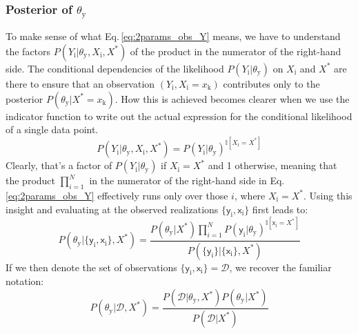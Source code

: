 \documentclass[]{report}
\begin{document}
\subsubsection{Posterior of $\theta_\mathrm{y}$}
To make sense of what Eq.\,\ref{eq:2params_obs_Y} means, we have to understand the factors $P(Y_\mathrm{i}|\theta_\mathrm{y}, X_\mathrm{i}, X^*)$ of the product in the numerator of the right-hand side. The conditional dependencies of the likelihood $P(Y_\mathrm{i}|\theta_\mathrm{y})$ on $X_\mathrm{i}$ and $X^*$ are there to ensure that an observation $(Y_\mathrm{i}, X_\mathrm{i}=x_\mathrm{k})$ contributes only to the posterior $P(\theta_\mathrm{y}|X^*=x_\mathrm{k})$. How this is achieved becomes clearer when we use the indicator function to write out the actual expression for the conditional likelihood of a single data point.
\begin{equation}
P(Y_\mathrm{i}|\theta_\mathrm{y}, X_\mathrm{i}, X^*) = P(Y_\mathrm{i}|\theta_\mathrm{y})^{\mathbb{I}[X_\mathrm{i}=X^*]} 
\end{equation}
Clearly, that's a factor of $P(Y_\mathrm{i}|\theta_\mathrm{y})$ if $X_\mathrm{i}=X^*$ and 1 otherwise, meaning that the product $\prod_{i=1}^{N}$ in the numerator of the right-hand side in Eq.\,\ref{eq:2params_obs_Y} effectively runs only over those $i$, where $X_\mathrm{i}=X^*$. Using this insight and evaluating at the observed realizations $\{\mathsf{y}_\mathrm{i}, \mathsf{x}_\mathrm{i}\}$ first leads to:
\begin{equation}
P(\theta_\mathrm{y}|\{\mathsf{y}_\mathrm{i}, \mathsf{x}_\mathrm{i}\}, X^*) = \frac{P(\theta_\mathrm{y}|X^*)\prod_{i=1}^{N}P(\mathsf{y}_\mathrm{i}|\theta_\mathrm{y})^{\mathbb{I}[\mathsf{x}_\mathrm{i}=X^*]}}{P(\{\mathsf{y}_\mathrm{i}\}| \{\mathsf{x}_\mathrm{i}\}, X^*)} 
\end{equation}
If we then denote the set of observations $\{\mathsf{y}_\mathrm{i}, \mathsf{x}_\mathrm{i}\} = \mathcal{D}$, we recover the familiar notation:
\begin{equation}
P(\theta_\mathrm{y}|\mathcal{D}, X^*) = \frac{P(\mathcal{D}|\theta_\mathrm{y}, X^*)P(\theta_\mathrm{y}|X^*)}{P(\mathcal{D}|X^*)} 
\end{equation}
\end{document}
